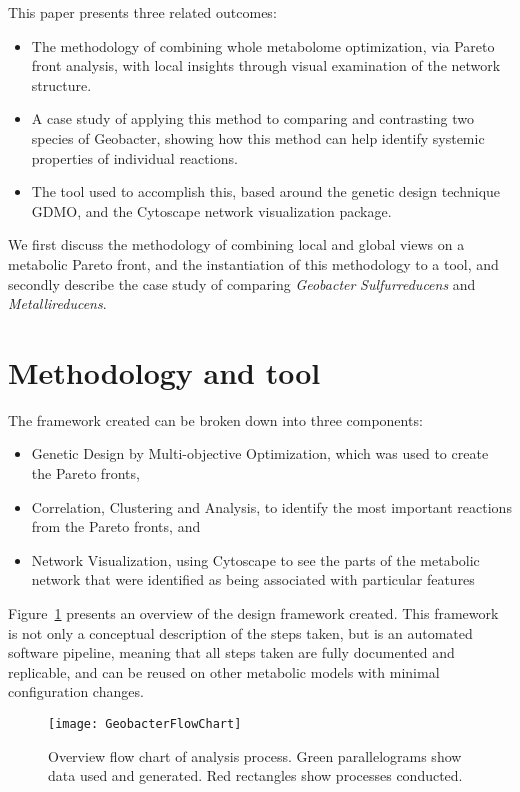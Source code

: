 \documentclass[a4paper,11pt]{article}
\begin{document}
This paper presents three related outcomes:
\begin{itemize}
	\item The methodology of combining whole metabolome optimization, via Pareto front analysis, with local insights through visual examination of the network structure.
	\item A case study of applying this method to comparing and contrasting two species of Geobacter, showing how this method can help identify systemic properties of individual reactions.
	\item The tool used to accomplish this, based around the genetic design technique GDMO, and the Cytoscape network visualization package.
\end{itemize}

We first discuss the methodology of combining local and global views on a metabolic Pareto front, and the instantiation of this methodology to a tool, and secondly describe the case study of comparing {\it Geobacter} {\it Sulfurreducens} and {\it Metallireducens}.

\section{Methodology and tool}
The framework created can be broken down into three components: 
\begin{itemize}
\item Genetic Design by Multi-objective Optimization, which was used to create the Pareto fronts,
\item Correlation, Clustering and Analysis, to identify the most important reactions from the Pareto fronts, and
\item Network Visualization, using Cytoscape to see the parts of the metabolic network that were identified as being associated with particular features 
\end{itemize}

Figure~\ref{fig:flowdiagram} presents an overview of the design framework created. This framework is not only a conceptual description of the steps taken, but is an automated software pipeline, meaning that all steps taken are fully documented and replicable, and can be reused on other metabolic models with minimal configuration changes. 

\begin{figure}[!htb]
\texttt{[image: GeobacterFlowChart]}
\caption{Overview flow chart of analysis process. Green parallelograms show data used and generated. Red rectangles show processes conducted.}
\label{fig:flowdiagram}
\end{figure}
\end{document}
